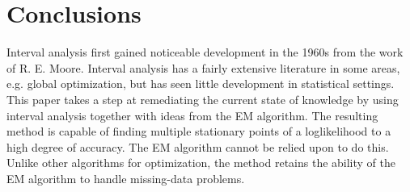 %
\section{Conclusions}\label{section:conclusions}

Interval analysis first gained noticeable development in the 1960s from
the work of 
R. E. Moore.  Interval analysis has a fairly extensive
literature in some areas, e.g. global optimization, but has seen little
development in statistical settings.  This paper takes a step at remediating
the current state of knowledge by using interval analysis together with ideas
from the EM algorithm.  The resulting method is capable of finding multiple
stationary points of a loglikelihood to a high degree of accuracy.  The EM
algorithm cannot be relied upon to do this.  Unlike
other algorithms for optimization, the method retains the ability of the EM
algorithm to handle missing-data problems.

%


